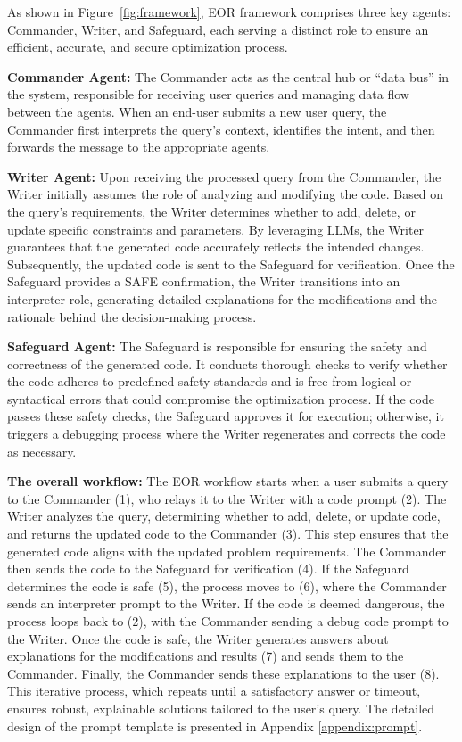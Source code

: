 As shown in Figure~\ref{fig:framework}, EOR framework comprises three key agents: Commander, Writer, and Safeguard, each serving a distinct role to ensure an efficient, accurate, and secure optimization process.

\textbf{Commander Agent:} The Commander acts as the central hub or ``data bus'' in the system, responsible for receiving user queries and managing data flow between the agents. When an end-user submits a new user query, the Commander first interprets the query's context, identifies the intent, and then forwards the message to the appropriate agents.

\textbf{Writer Agent:} Upon receiving the processed query from the Commander, the Writer initially assumes the role of analyzing and modifying the code. Based on the query's requirements, the Writer determines whether to add, delete, or update specific constraints and parameters. By leveraging LLMs, the Writer guarantees that the generated code accurately reflects the intended changes. Subsequently, the updated code is sent to the Safeguard for verification. Once the Safeguard provides a SAFE confirmation, the Writer transitions into an interpreter role, generating detailed explanations for the modifications and the rationale behind the decision-making process.

\textbf{Safeguard Agent:} The Safeguard is responsible for ensuring the safety and correctness of the generated code. It conducts thorough checks to verify whether the code adheres to predefined safety standards and is free from logical or syntactical errors that could compromise the optimization process. If the code passes these safety checks, the Safeguard approves it for execution; otherwise, it triggers a debugging process where the Writer regenerates and corrects the code as necessary.

\textbf{The overall workflow:} The EOR workflow starts when a user submits a query to the Commander (1), who relays it to the Writer with a code prompt (2). The Writer analyzes the query, determining whether to add, delete, or update code, and returns the updated code to the Commander (3). This step ensures that the generated code aligns with the updated problem requirements. The Commander then sends the code to the Safeguard for verification (4). If the Safeguard determines the code is safe (5), the process moves to (6), where the Commander sends an interpreter prompt to the Writer. If the code is deemed dangerous, the process loops back to (2), with the Commander sending a debug code prompt to the Writer. Once the code is safe, the Writer generates answers about explanations for the modifications and results (7) and sends them to the Commander. Finally, the Commander sends these explanations to the user (8). This iterative process, which repeats until a satisfactory answer or timeout, ensures robust, explainable solutions tailored to the user's query. The detailed design of the prompt template is presented in Appendix \ref{appendix:prompt}.

